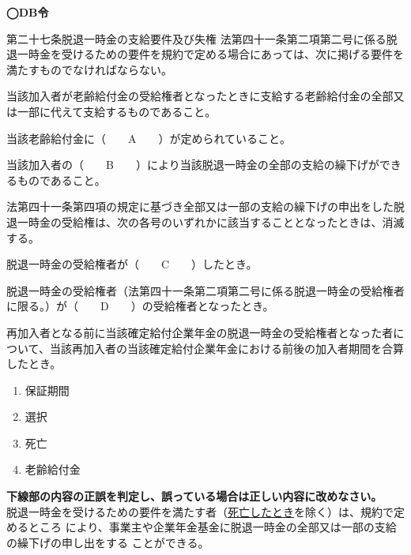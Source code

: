 \begin{fillblank}[年金1 2020 問題1(1)BC、自作]
  \noindent \textbf{◯DB令}
  \begin{lawstructure}
    \begin{lawarticle}{第二十七条}{脱退一時金の支給要件及び失権}
      法第四十一条第二項第二号に係る脱退一時金を受けるための要件を規約で定める場合にあっては、次に掲げる要件を満たすものでなければならない。

      当該加入者が老齢給付金の受給権者となったときに支給する老齢給付金の全部又は一部に代えて支給するものであること。

      当該老齢給付金に（　　A　　）が定められていること。

      当該加入者の（　　B　　）により当該脱退一時金の全部の支給の繰下げができるものであること。

      法第四十一条第四項の規定に基づき全部又は一部の支給の繰下げの申出をした脱退一時金の受給権は、次の各号のいずれかに該当することとなったときは、消滅する。
      
      脱退一時金の受給権者が（　　C　　）したとき。

      脱退一時金の受給権者（法第四十一条第二項第二号に係る脱退一時金の受給権者に限る。）が（　　D　　）の受給権者となったとき。

      再加入者となる前に当該確定給付企業年金の脱退一時金の受給権者となった者について、当該再加入者の当該確定給付企業年金における前後の加入者期間を合算したとき。
    \end{lawarticle}
  \end{lawstructure}  
\end{fillblank}

\begin{answerbox}
  \begin{enumerate}[A:]
    \item 保証期間
    \item 選択
    \item 死亡
    \item 老齢給付金
  \end{enumerate}
\end{answerbox}

\begin{truefalse}[年金1 2022 問題1(3)エ]
        \textbf{下線部の内容の正誤を判定し、誤っている場合は正しい内容に改めなさい。}
  \\

  脱退一時金を受けるための要件を満たす者（\underline{死亡したとき}を除く）は、規約で定めるところ
により、事業主や企業年金基金に脱退一時金の全部又は一部の支給の繰下げの申し出をする
ことができる。
\end{truefalse}

